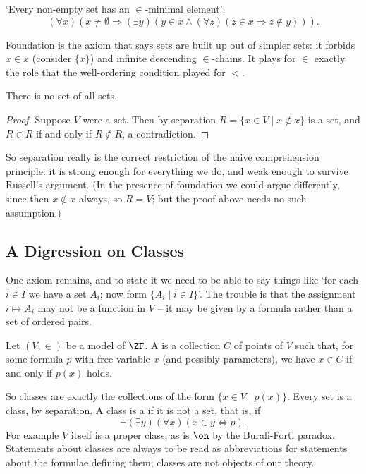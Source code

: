 \begin{axiom}[Foundation]
  `Every non-empty set has an $\in$-minimal element':
  $$
  (\forall x)(x \neq \emptyset \Rightarrow(\exists y)(y \in x \land(\forall z)(z \in x \Rightarrow z \notin y))).
  $$
\end{axiom}

Foundation is the axiom that says sets are built up out of simpler sets: it forbids $x \in x$ (consider $\{x\}$) and infinite descending $\in$-chains. It plays for $\in$ exactly the role that the well-ordering condition played for $<$.

\begin{proposition}
  There is no set of all sets.
\end{proposition}
\begin{proof}
  Suppose $V$ were a set. Then by separation $R = \{x \in V \mid x \notin x\}$ is a set, and $R \in R$ if and only if $R \notin R$, a contradiction.
\end{proof}

So separation really is the correct restriction of the naive comprehension principle: it is strong enough for everything we do, and weak enough to survive Russell's argument. (In the presence of foundation we could argue differently, since then $x \notin x$ always, so $R = V$; but the proof above needs no such assumption.)

\subsection{A Digression on Classes}

One axiom remains, and to state it we need to be able to say things like `for each $i \in I$ we have a set $A_i$; now form $\{A_i \mid i \in I\}$'. The trouble is that the assignment $i \mapsto A_i$ may not be a function in $V$ -- it may be given by a formula rather than a set of ordered pairs.

\begin{definition}[Class]
  Let $(V, \in)$ be a model of $\ZF$. A  is a collection $C$ of points of $V$ such that, for some formula $p$ with free variable $x$ (and possibly parameters), we have $x \in C$ if and only if $p(x)$ holds.
\end{definition}

So classes are exactly the collections of the form $\{x \in V \mid p(x)\}$. Every set is a class, by separation. A class is a  if it is not a set, that is, if
$$\lnot (\exists y)(\forall x)(x \in y \Leftrightarrow p).$$
For example $V$ itself is a proper class, as is $\on$ by the Burali-Forti paradox. Statements about classes are always to be read as abbreviations for statements about the formulae defining them; classes are not objects of our theory.


